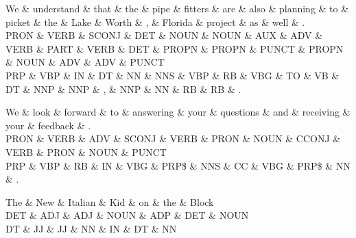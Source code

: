 \begin{dependency}
\begin{deptext}
We \& understand \& that \& the \& pipe \& fitters \& are \& also \& planning \& to \& picket \& the \& Lake \& Worth \& , \& Florida \& project \& as \& well \& . \\
PRON \& VERB \& SCONJ \& DET \& NOUN \& NOUN \& AUX \& ADV \& VERB \& PART \& VERB \& DET \& PROPN \& PROPN \& PUNCT \& PROPN \& NOUN \& ADV \& ADV \& PUNCT \\
PRP \& VBP \& IN \& DT \& NN \& NNS \& VBP \& RB \& VBG \& TO \& VB \& DT \& NNP \& NNP \& , \& NNP \& NN \& RB \& RB \& . \\
\end{deptext}



\end{dependency}

\begin{dependency}
\begin{deptext}
We \& look \& forward \& to \& answering \& your \& questions \& and \& receiving \& your \& feedback \& . \\
PRON \& VERB \& ADV \& SCONJ \& VERB \& PRON \& NOUN \& CCONJ \& VERB \& PRON \& NOUN \& PUNCT \\
PRP \& VBP \& RB \& IN \& VBG \& PRP\$ \& NNS \& CC \& VBG \& PRP\$ \& NN \& . \\
\end{deptext}



\end{dependency}

\begin{dependency}
\begin{deptext}
The \& New \& Italian \& Kid \& on \& the \& Block \\
DET \& ADJ \& ADJ \& NOUN \& ADP \& DET \& NOUN \\
DT \& JJ \& JJ \& NN \& IN \& DT \& NN \\
\end{deptext}



\end{dependency}

